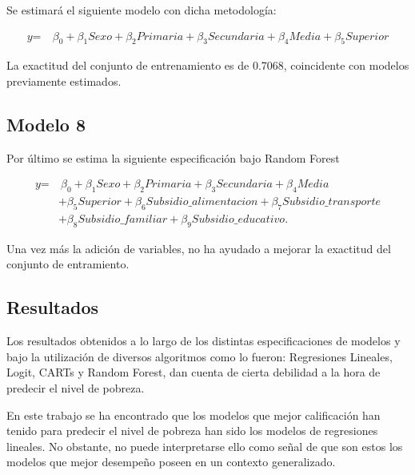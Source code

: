 \documentclass[11pt, a4paper]{article}
\begin{document}
Se estimará el siguiente modelo con dicha metodología: 

\[
\begin{aligned}
\textit{y} = &\ \beta_0  + \beta_1 \textit{Sexo} + \beta_2 \textit{Primaria} 
+ \beta_3 \textit{Secundaria} + \beta_4 \textit{Media}  + \beta_5 \textit{Superior} 
\end{aligned}
\]

La exactitud del conjunto de entrenamiento es de 0.7068, coincidente con modelos previamente estimados. 

\subsection*{Modelo 8}

Por último se estima la siguiente especificación bajo Random Forest 

\[
\begin{aligned}
\textit{y} = &\ \beta_0  + \beta_1 \textit{Sexo} + \beta_2 \textit{Primaria} 
+ \beta_3 \textit{Secundaria} + \beta_4 \textit{Media} \\
& + \beta_5 \textit{Superior} + \beta_6 \textit{Subsidio\_alimentacion} 
+ \beta_7 \textit{Subsidio\_transporte} \\
& + \beta_8 \textit{Subsidio\_familiar} + \beta_{9} \textit{Subsidio\_educativo}.
\end{aligned}
\]

Una vez más la adición de variables, no ha ayudado a mejorar la exactitud del conjunto de entramiento. 


\subsection{Resultados}

Los resultados obtenidos a lo largo de los distintas especificaciones de modelos y bajo la utilización de diversos algoritmos como lo fueron: Regresiones Lineales, Logit, CARTs y Random Forest, dan cuenta de cierta debilidad a la hora de predecir el nivel de pobreza. 

En este trabajo se ha encontrado que los modelos que mejor calificación han tenido para predecir el nivel de pobreza han sido los modelos de regresiones lineales. No obstante, no puede interpretarse ello como señal de que son estos los modelos que mejor desempeño poseen en un contexto generalizado. 
\end{document}
